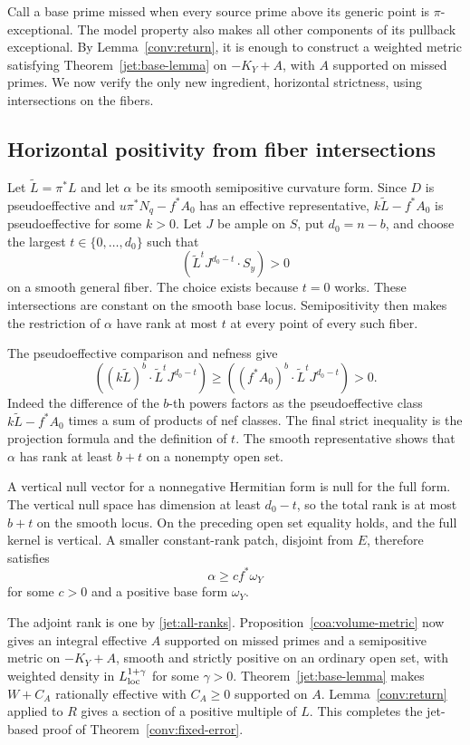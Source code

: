 Call a base prime missed when every source prime above its generic
point is $\pi$-exceptional.  The model property also makes all other
components of its pullback exceptional.  By Lemma~\ref{conv:return},
it is enough to construct a weighted metric satisfying
Theorem~\ref{jet:base-lemma} on $-K_Y+A$, with $A$ supported on missed
primes.  We now verify the only new ingredient, horizontal strictness,
using intersections on the fibers.

\subsection{Horizontal positivity from fiber intersections}

Let $\widetilde L=\pi^*L$ and let $\alpha$ be its smooth semipositive
curvature form.  Since $D$ is pseudoeffective and
$u\pi^*N_q-f^*A_0$ has an effective representative,
$k\widetilde L-f^*A_0$ is pseudoeffective for some $k>0$.
Let $J$ be ample on $S$, put $d_0=n-b$, and choose the largest
$t\in\{0,\ldots,d_0\}$ such that
\[
 (\widetilde L^tJ^{d_0-t}\cdot S_y)>0
\]
on a smooth general fiber.  The choice exists because $t=0$ works.
These intersections are constant on the smooth base locus.
Semipositivity then makes the restriction of $\alpha$ have rank at
most $t$ at every point of every such fiber.

The pseudoeffective comparison and nefness give
\[
 ((k\widetilde L)^b\cdot\widetilde L^tJ^{d_0-t})
 \ge ((f^*A_0)^b\cdot\widetilde L^tJ^{d_0-t})>0.
\]
Indeed the difference of the $b$-th powers factors as the
pseudoeffective class $k\widetilde L-f^*A_0$ times a sum of products
of nef classes.  The final strict inequality is the projection
formula and the definition of $t$.  The smooth representative shows
that $\alpha$ has rank at least $b+t$ on a nonempty open set.

A vertical null vector for a nonnegative Hermitian form is null for
the full form.  The vertical null space has dimension at least
$d_0-t$, so the total rank is at most $b+t$ on the smooth locus.
On the preceding open set equality holds, and the full kernel is
vertical.  A smaller constant-rank patch, disjoint from $E$, therefore
satisfies
\[
 \alpha\ge c f^*\omega_Y
\]
for some $c>0$ and a positive base form $\omega_Y$.

The adjoint rank is one by \eqref{jet:all-ranks}.
Proposition~\ref{coa:volume-metric} now gives an integral effective
$A$ supported on missed primes and a semipositive metric on
$-K_Y+A$, smooth and strictly positive on an ordinary open set,
with weighted density in $L^{1+\gamma}_{\rm loc}$ for some
$\gamma>0$.  Theorem~\ref{jet:base-lemma} makes $W+C_A$ rationally
effective with $C_A\ge0$ supported on $A$.
Lemma~\ref{conv:return} applied to $R$ gives a section of a positive
multiple of $L$.  This completes the jet-based proof of
Theorem~\ref{conv:fixed-error}.
